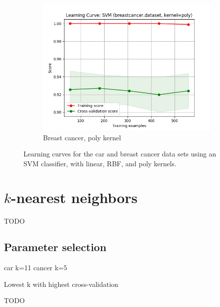 \documentclass{article}
\begin{document}
\begin{figure}[htb]
\begin{subfigure}{0.33\textwidth}
      \includegraphics[width=\linewidth]{out/svm/breastcancer-kernel-poly.png}
      \caption{Breast cancer, poly kernel}
      \label{fig:svm-learning-6}
    \end{subfigure}

    \caption{Learning curves for the car and breast cancer data sets using an SVM classifier, with linear, RBF, and poly kernels.}
    \label{fig:svm-learning}
    \end{figure}

    \section{$k$-nearest neighbors}
    TODO

    \subsection{Parameter selection}
    car k=11
    cancer k=5

    Lowest k with highest cross-validation

    TODO 
\end{document}
